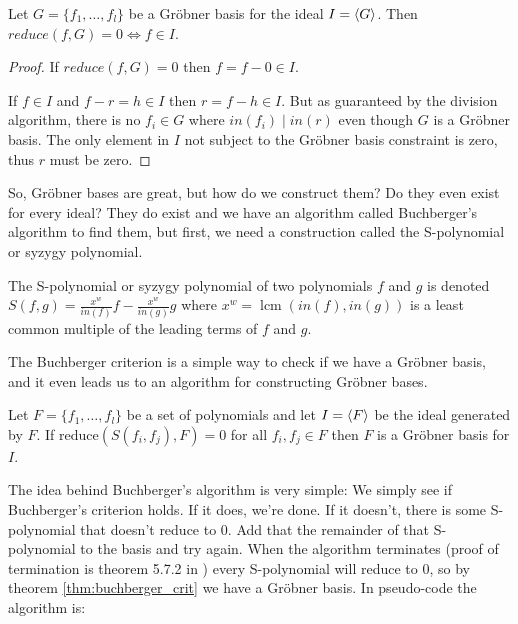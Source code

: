 \documentclass{article}
\theoremstyle{changedot}
\theoremstyle{changedotbreak}
\theoremstyle{nonumberplain}
\newtheorem{proof}{Proof}
\DeclarePairedDelimiter{\tuple}{\langle}{\rangle}
\DeclareMathOperator{\lcm}{lcm}
\begin{document}
\begin{theorem}
  Let $G = \{f_{1}, \dots, f_{l}\}$ be a Gröbner basis for the ideal $I = \tuple{G}$. Then $reduce(f, G) = 0 \Longleftrightarrow f \in I$.
\end{theorem}
\begin{proof}
  If $reduce(f, G) = 0$ then $f = f - 0 \in I$.

  If $f \in I$ and $f - r = h \in I$ then $r = f - h \in I$. But as guaranteed by the division algorithm, there is no $f_{i} \in G$ where $in(f_{i}) \mid in(r)$ even though $G$ is a Gröbner basis. The only element in $I$ not subject to the Gröbner basis constraint is zero, thus $r$ must be zero.
\end{proof}

So, Gröbner bases are great, but how do we construct them? Do they even exist for every ideal? They do exist and we have an algorithm called Buchberger's algorithm to find them, but first, we need a construction called the S-polynomial or syzygy polynomial.

\begin{definition}
  The S-polynomial or syzygy polynomial of two polynomials $f$ and $g$ is denoted $S(f, g) = \frac{x^{w}}{in(f)} f - \frac{x^{w}}{in(g)} g$ where $x^{w} = \lcm(in(f), in(g))$ is a least common multiple of the leading terms of $f$ and $g$.
\end{definition}

The Buchberger criterion is a simple way to check if we have a Gröbner basis, and it even leads us to an algorithm for constructing Gröbner bases.

\begin{theorem}\label{thm:buchberger_crit}
Let $F = \{f_{1}, \dots, f_{l}\}$ be a set of polynomials and let $I = \tuple F$ be the ideal generated by $F$. If $\text{reduce}(S(f_{i}, f_{j}), F) = 0$ for all $f_{i}, f_{j} \in F$ then $F$ is a Gröbner basis for $I$.
\end{theorem}

The idea behind Buchberger's algorithm is very simple: We simply see if Buchberger's criterion holds. If it does, we're done. If it doesn't, there is some S-polynomial that doesn't reduce to 0. Add that the remainder of that S-polynomial to the basis and try again. When the algorithm terminates (proof of termination is theorem 5.7.2 in \cite{NL}) every S-polynomial will reduce to 0, so by theorem \ref{thm:buchberger_crit} we have a Gröbner basis. In pseudo-code the algorithm is:
\end{document}
